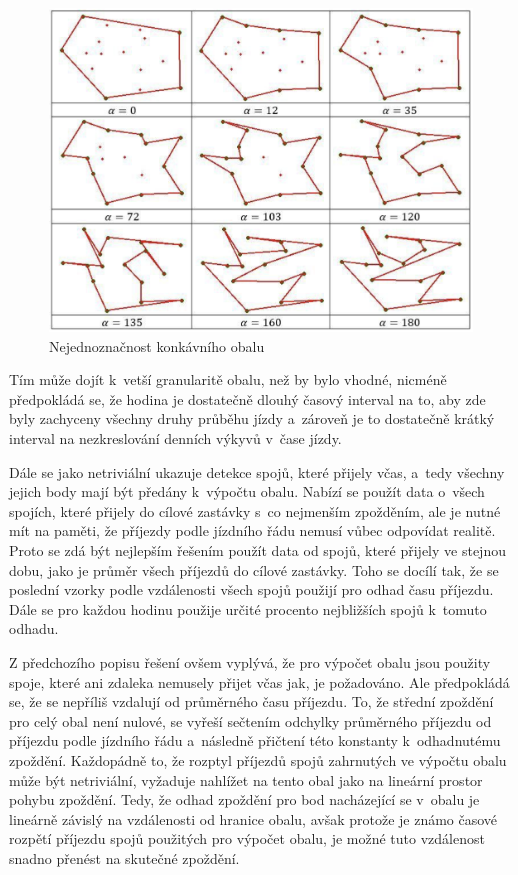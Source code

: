\begin{figure}
\centering
  \includegraphics[width=0.8\linewidth]{../img/konkavni_obal_nejednoznacny.png}
  \caption{Nejednoznačnost konkávního obalu}
  \label{fig:konkavni_obal_nejednoznacny}
\end{figure}


\bigbreak

 Tím může dojít k~vetší granularitě obalu, než by bylo vhodné, nicméně předpokládá se, že hodina je dostatečně dlouhý časový interval na to, aby zde byly zachyceny všechny druhy průběhu jízdy a~zároveň je to dostatečně krátký interval na nezkreslování denních výkyvů v~čase jízdy.


 \bigbreak

Dále se jako netriviální ukazuje detekce spojů, které přijely včas, a~tedy všechny jejich body mají být předány k~výpočtu obalu. Nabízí se použít data o~všech spojích, které přijely do cílové zastávky s~co nejmenším zpožděním, ale je nutné mít na paměti, že příjezdy podle jízdního řádu nemusí vůbec odpovídat realitě. Proto se zdá být nejlepším řešením použít data od spojů, které přijely ve stejnou dobu, jako je průměr všech příjezdů do cílové zastávky. Toho se docílí tak, že se poslední vzorky podle vzdálenosti všech spojů použijí pro odhad času příjezdu. Dále se pro každou hodinu použije určité procento nejbližších spojů k~tomuto odhadu.


\bigbreak

Z předchozího popisu řešení ovšem vyplývá, že pro výpočet obalu jsou použity spoje, které ani zdaleka nemusely přijet včas jak, je požadováno. Ale předpokládá se, že se nepříliš vzdalují od průměrného času příjezdu. To, že střední zpoždění pro celý obal není nulové, se vyřeší sečtením odchylky průměrného příjezdu od příjezdu podle jízdního řádu a~následně přičtení této konstanty k~odhadnutému zpoždění. Každopádně to, že rozptyl příjezdů spojů zahrnutých ve výpočtu obalu může být netriviální, vyžaduje nahlížet na tento obal jako na lineární prostor pohybu zpoždění. Tedy, že odhad zpoždění pro bod nacházející se v~obalu je lineárně závislý na vzdálenosti od hranice obalu, avšak protože je známo časové rozpětí příjezdu spojů použitých pro výpočet obalu, je možné tuto vzdálenost snadno přenést na skutečné zpoždění.


